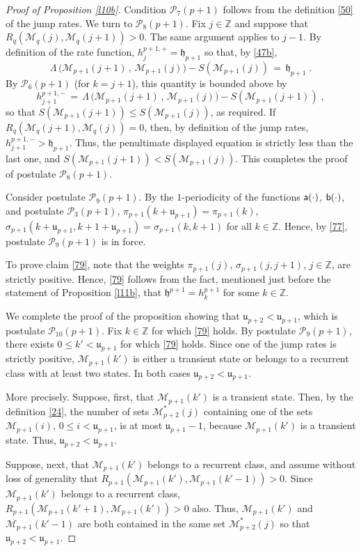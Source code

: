 \documentclass[reqno]{amsart}
\theoremstyle{plain}
\theoremstyle{definition}
\newcommand{\mc}[1]{{\mathcal #1}}
\newcommand{\mf}[1]{{\mathfrak #1}}
\newcommand{\bb}[1]{{\mathbb #1}}
\newcommand{\ms}[1]{{\mathscr #1}}
\newcommand{\mss}[1]{{\textsf #1}}
\newcounter{as}[section]
\newcommand{\<}{\langle}
\renewcommand{\>}{\rangle}
\begin{document}
\begin{proof}[Proof of Proposition \ref{l10b}]
Condition $\mc P_7(p+1)$ follows from the definition \eqref{50} of
the jump rates.  We turn to $\mc P_8(p+1)$.  Fix $j\in \bb Z$ and
suppose that $R_q(\ms M_{q}(j),\ms M_{q}(j + 1))>0$. The same argument
applies to $j-1$. By definition of the rate function,
$h^{p+1, +}_j = \mf h_{p+1}$ so that, by \eqref{47b},
\begin{equation*}
\Lambda\, \big (\ms M_{p+1}(j+ 1) \,,\,
\ms M_{p+1}(j)\big)-S(\ms M_{p+1}(j)) \,=\,
\mf h_{p+1}\;.
\end{equation*}
By $\mc P_6(p+1)$ (for $k=j+1$), this quantity is bounded above by
\begin{equation*}
h^{p+1, -}_{j+1} \,=\,
\Lambda\, \big (\ms M_{p+1}(j+ 1) \,,\,
\ms M_{p+1}(j)\big)-S(\ms M_{p+1}(j+1)) \;,
\end{equation*}
so that $S(\ms M_{p+1}(j+1)) \le S(\ms M_{p+1}(j))$, as required. If
$R_q(\ms M_{q}(j+1),\ms M_{q}(j))=0$, then, by definition of the jump
rates, $h^{p+1, -}_{j+1} > \mf h_{p+1}$. Thus, the penultimate
displayed equation is strictly less than the last one, and
$S(\ms M_{p+1}(j+1)) < S(\ms M_{p+1}(j))$. This completes
the proof of postulate $\mc P_8(p+1)$.

Consider postulate $\mc P_9(p+1)$. By the $1$-periodicity of
the functions $\mss a(\cdot)$, $\mss b(\cdot)$, and postulate
$\mc P_3(p+1)$, $\pi_{p+1}(k+\mf u_{p+1}) = \pi_{p+1}(k)$,
$\sigma_{p+1}(k+\mf u_{p+1}, k+ 1+ \mf u_{p+1}) = \sigma_{p+1}(k, k+1)$
for all $k\in \bb Z$. Hence, by \eqref{77}, postulate $\mc P_9(p+1)$
is in force.  

To prove claim \eqref{79}, note that the weights $\pi_{p+1}(j)$,
$\sigma_{p+1}(j,j+1)$, $j\in\bb Z$, are strictly positive. Hence,
\eqref{79} follows from the fact, mentioned just before the statement
of Proposition \ref{l11b}, that $\mf h^{p+1} = h^{p+1}_{k}$ for some
$k\in \bb Z$.

We complete the proof of the proposition showing that
$\mf u_{p+2} < \mf u_{p+1}$, which is postulate $\mc P_{10}(p+1)$.
Fix $k\in \bb Z$ for which \eqref{79} holds.  By postulate
$\mc P_9(p+1)$, there exists $0\le k'<\mf u_{p+1}$ for which
\eqref{79} holds. Since one of the jump rates is strictly positive,
$\ms M_{p+1}(k')$ is either a transient state or belongs to a
recurrent class with at least two states. In both cases
$\mf u_{p+2} < \mf u_{p+1}$.

More precisely. Suppose, first, that $\ms M_{p+1}(k')$ is a transient
state. Then, by the definition \eqref{24}, the number of sets
$\ms M^*_{p+2}(j)$ containing one of the sets $\ms M_{p+1}(i)$,
$0\le i < \mf u_{p+1}$, is at most $\mf u_{p+1} -1$, because
$\ms M_{p+1}(k')$ is a transient state. Thus,
$\mf u_{p+2} < \mf u_{p+1}$.

Suppose, next, that $\ms M_{p+1}(k')$ belongs to a recurrent class,
and assume without loss of generality that
$R_{p+1}(\ms M_{p+1}(k'),\ms M_{p+1}(k'-1)) >0$.  Since
$\ms M_{p+1}(k')$ belongs to a recurrent class,
$R_{p+1}(\ms M_{p+1}(k'+1),\ms M_{p+1}(k')) >0$ also.  Thus,
$\ms M_{p+1}(k')$ and $\ms M_{p+1}(k'-1)$ are both contained in the
same set $\ms M^*_{p+2}(j)$ so that $\mf u_{p+2} < \mf u_{p+1}$.
\end{proof}
\end{document}
